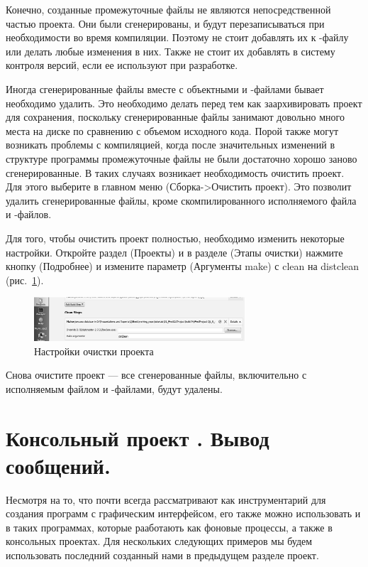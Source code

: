 Конечно, созданные промежуточные файлы не являются непосредственной частью проекта. Они были
сгенерированы, и будут перезаписываться при необходимости во время компиляции. Поэтому не стоит добавлять их к
-файлу или делать любые изменения в них. Также не стоит их добавлять
в систему контроля версий, если ее используют при разработке.

Иногда сгенерированные файлы вместе с объектными и -файлами бывает
необходимо удалить. Это необходимо делать перед тем как заархивировать проект для сохранения, поскольку сгенерированные
файлы занимают довольно много места на диске по сравнению с объемом исходного кода. Порой также могут возникать
проблемы с компиляцией, когда после значительных изменений в структуре программы промежуточные файлы не были достаточно
хорошо заново сгенерированные. В таких случаях возникает необходимость очистить проект. Для этого выберите в главном
меню  (Сборка->Очистить проект).
Это позволит удалить сгенерированные файлы, кроме скомпилированного исполняемого файла и
-файлов.

Для того, чтобы очистить
проект полностью, необходимо изменить некоторые настройки. Откройте раздел
(Проекты) и в разделе
(Этапы очистки) нажмите кнопку
(Подробнее) и измените параметр
 (Аргументы make)
с clean на distclean (рис.~\ref{ch12:refDrawing1}).

\begin{figure}[htb]
\begin{center}
\includegraphics[width=0.7\textwidth]{img/ris_12_2}
\caption{Настройки очистки проекта}
\label{ch12:refDrawing1}
\end{center}
\end{figure}

Снова очистите проект --- все сгенерованные файлы, включительно с исполняемым файлом и -файлами, будут
удалены.

\section[Консольный проект \Sys{Qt}.Вывод сообщений.]{Консольный проект . Вывод сообщений.}
Несмотря на то, что  почти всегда рассматривают как
инструментарий для создания программ с графическим интерфейсом, его также можно использовать и в таких программах,
которые рааботають как фоновые процессы, а также в консольных проектах. Для нескольких следующих примеров
мы будем использовать последний созданный нами в предыдущем разделе проект.

